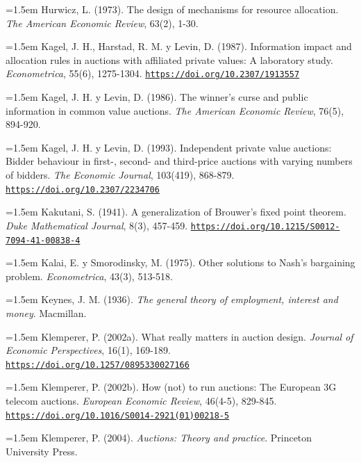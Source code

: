 \documentclass[10pt,a4paper]{article}
\begin{document}
\noindent\hangindent=1.5em Hurwicz, L. (1973). The design of mechanisms for resource allocation. \textit{The American Economic Review}, 63(2), 1-30.

\noindent\hangindent=1.5em Kagel, J. H., Harstad, R. M. y Levin, D. (1987). Information impact and allocation rules in auctions with affiliated private values: A laboratory study. \textit{Econometrica}, 55(6), 1275-1304. \href{https://doi.org/10.2307/1913557}{\nolinkurl{https://doi.org/10.2307/1913557}}

\noindent\hangindent=1.5em Kagel, J. H. y Levin, D. (1986). The winner's curse and public information in common value auctions. \textit{The American Economic Review}, 76(5), 894-920.

\noindent\hangindent=1.5em Kagel, J. H. y Levin, D. (1993). Independent private value auctions: Bidder behaviour in first-, second- and third-price auctions with varying numbers of bidders. \textit{The Economic Journal}, 103(419), 868-879. \href{https://doi.org/10.2307/2234706}{\nolinkurl{https://doi.org/10.2307/2234706}}

\noindent\hangindent=1.5em Kakutani, S. (1941). A generalization of Brouwer's fixed point theorem. \textit{Duke Mathematical Journal}, 8(3), 457-459. \href{https://doi.org/10.1215/S0012-7094-41-00838-4}{\nolinkurl{https://doi.org/10.1215/S0012-7094-41-00838-4}}

\noindent\hangindent=1.5em Kalai, E. y Smorodinsky, M. (1975). Other solutions to Nash’s bargaining problem. \textit{Econometrica}, 43(3), 513-518.

\noindent\hangindent=1.5em Keynes, J. M. (1936). \textit{The general theory of employment, interest and money}. Macmillan.

\noindent\hangindent=1.5em Klemperer, P. (2002a). What really matters in auction design. \textit{Journal of Economic Perspectives}, 16(1), 169-189. \href{https://doi.org/10.1257/0895330027166}{\nolinkurl{https://doi.org/10.1257/0895330027166}}

\noindent\hangindent=1.5em Klemperer, P. (2002b). How (not) to run auctions: The European 3G telecom auctions. \textit{European Economic Review}, 46(4-5), 829-845. \href{https://doi.org/10.1016/S0014-2921(01)00218-5}{\nolinkurl{https://doi.org/10.1016/S0014-2921(01)00218-5}}

\noindent\hangindent=1.5em Klemperer, P. (2004). \textit{Auctions: Theory and practice}. Princeton University Press.
\end{document}
